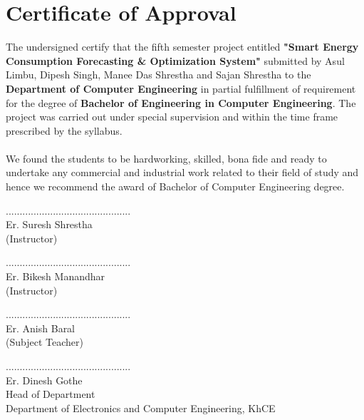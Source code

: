 		\large
			\chapter*{Certificate of Approval}
		\normalsize
		    The undersigned certify that the fifth semester project entitled \textbf{"Smart Energy Consumption Forecasting \& Optimization System"} submitted by Asul Limbu, Dipesh Singh, Manee Das Shrestha and Sajan Shrestha to the \textbf{Department of Computer Engineering} in partial fulfillment of requirement for the degree of \textbf{Bachelor of Engineering in Computer Engineering}. The project was carried out under special supervision and within the time frame prescribed by the syllabus. \\
		    \\
			We found the students to be hardworking, skilled, bona fide and ready to undertake any commercial and industrial work related to their field of study and hence we recommend the award of Bachelor of Computer Engineering degree. \\
			\vspace{2cm}

                \noindent
                \begin{minipage}{0.45\textwidth}
                .............................................\\
                Er. Suresh Shrestha\\
                (Instructor)
                \end{minipage}
                \hfill
                \begin{minipage}{0.45\textwidth}
                \raggedleft
                .............................................\\
                Er. Bikesh Manandhar\\
                (Instructor)
                \end{minipage}

                \vspace{2cm}

            \par
            \noindent
            .............................................\\
            Er. Anish Baral\\
            (Subject Teacher)\\
            \vspace{1cm}
            \par
            \noindent
            .............................................\\
			Er. Dinesh Gothe\\
			Head of Department \\
			Department of Electronics and Computer Engineering, KhCE\\
		\break



